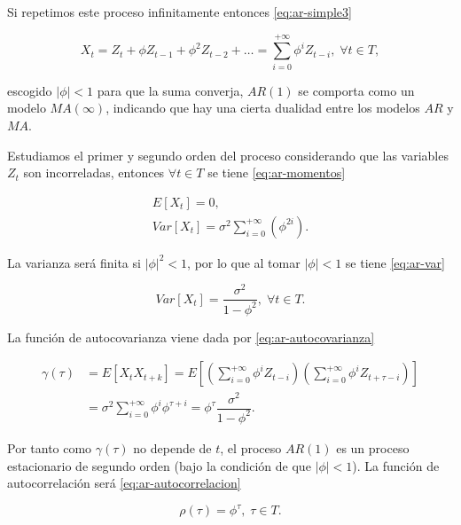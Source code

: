 Si repetimos este proceso infinitamente entonces \eqref{eq:ar-simple3}

\begin{equation}
  X_t = Z_t + \phi Z_{t-1} + \phi^2 Z_{t-2} + \ldots = \sum \limits^{+\infty}_{i = 0} \phi^i Z_{t - i}, \; \forall t \in T,
  \label{eq:ar-simple3}
\end{equation}

escogido $|\phi| < 1$ para que la suma converja, $AR(1)$ se comporta como un modelo $MA(\infty)$, indicando que hay una cierta dualidad entre los modelos $AR$ y $MA$.

Estudiamos el primer y segundo orden del proceso considerando que las variables $Z_t$ son incorreladas, entonces $\forall t \in T$ se tiene \eqref{eq:ar-momentos}

\begin{gather}
  E[X_t] = 0, \\
  Var[X_t] = \sigma^2 \sum \limits^{+\infty}_{i = 0} \left(\phi^{2i}\right).
  \label{eq:ar-momentos}
\end{gather}

La varianza será finita si $|\phi|^2 < 1$, por lo que al tomar $|\phi| < 1$ se tiene \eqref{eq:ar-var}

\begin{equation}
  Var[X_t] = \dfrac{\sigma^2}{1 - \phi^2}, \; \forall t \in T.
  \label{eq:ar-var}
\end{equation}

La función de autocovarianza viene dada por \eqref{eq:ar-autocovarianza}

\begin{equation}
  \begin{aligned}
    \gamma(\tau) & = E[X_t X_{t + k}] = E\left[\left(\sum \limits^{+\infty}_{i = 0} \phi^i Z_{t - i}\right)\left(\sum \limits^{+\infty}_{i = 0} \phi^i Z_{t + \tau - i}\right)\right] \\
    & = \sigma^2 \sum \limits^{+\infty}_{i = 0} \phi^i \phi^{\tau + i} = \phi^\tau \dfrac{\sigma^2}{1 - \phi^2}.
  \end{aligned}
  \label{eq:ar-autocovarianza}
\end{equation}

Por tanto como $\gamma(\tau)$ no depende de $t$, el proceso $AR(1)$ es un proceso estacionario de segundo orden (bajo la condición de que $|\phi| < 1$). La función de autocorrelación será \eqref{eq:ar-autocorrelacion}

\begin{equation}
  \rho(\tau) = \phi^\tau, \; \tau \in T.
  \label{eq:ar-autocorrelacion}
\end{equation}

